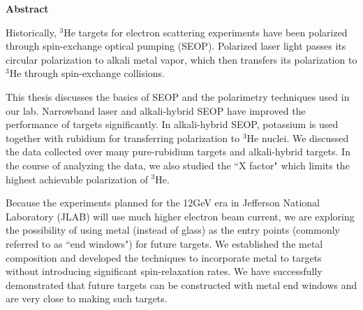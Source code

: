 \begin{center}
	\textbf{\large Abstract}
\end{center}

Historically, $^3$He targets for electron scattering experiments have been polarized through spin-exchange optical pumping (SEOP). Polarized laser light passes its circular polarization to alkali metal vapor, which then transfers its polarization to $^3$He through spin-exchange collisions. 

This thesis discusses the basics of SEOP and the polarimetry techniques used in our lab. Narrowband laser and alkali-hybrid SEOP have improved the performance of targets significantly. In alkali-hybrid SEOP, potassium is used together with rubidium for transferring polarization to $^3$He nuclei. We discussed the data collected over many pure-rubidium targets and alkali-hybrid targets. In the course of analyzing the data, we also studied the ``X factor" which limits the highest achievable polarization of $^3$He.

Because the experiments planned for the 12GeV era in Jefferson National Laboratory (JLAB) will use much higher electron beam current, we are exploring the possibility of using metal (instead of glass) as the entry points (commonly referred to as ``end windows") for future targets. We established the metal composition and developed the techniques to incorporate metal to targets without introducing significant spin-relaxation rates. We have successfully demonstrated that future targets can be constructed with metal end windows and are very close to making such targets.